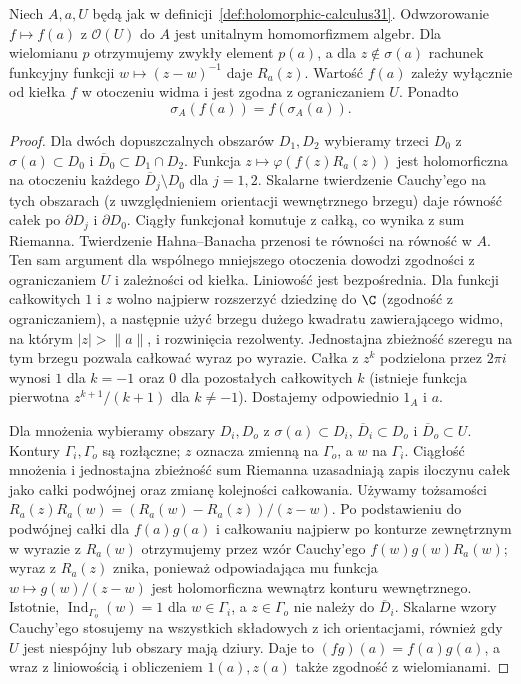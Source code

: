 \begin{twierdzenie}
\label{thm:holomorphic-calculus31}
Niech $A,a,U$ będą jak w definicji~\ref{def:holomorphic-calculus31}.
Odwzorowanie $f\mapsto f(a)$ z $\mathcal O(U)$ do $A$ jest unitalnym
homomorfizmem algebr. Dla wielomianu $p$ otrzymujemy zwykły element
$p(a)$, a dla $z\notin\sigma(a)$ rachunek funkcyjny funkcji
$w\mapsto(z-w)^{-1}$ daje $R_a(z)$. Wartość $f(a)$ zależy wyłącznie
od kiełka $f$ w otoczeniu widma i jest zgodna z ograniczaniem $U$.
Ponadto
\[
 \sigma_A(f(a))=f(\sigma_A(a)).
\]
\end{twierdzenie}
\begin{proof}
Dla dwóch dopuszczalnych obszarów $D_1,D_2$ wybieramy
trzeci $D_0$ z $\sigma(a)\subset D_0$ i
$\overline D_0\subset D_1\cap D_2$. Funkcja
$z\mapsto\varphi(f(z)R_a(z))$ jest holomorficzna
na otoczeniu każdego $\overline D_j\setminus D_0$
dla $j=1,2$. Skalarne twierdzenie Cauchy'ego na tych
obszarach (z uwzględnieniem orientacji wewnętrznego
brzegu) daje równość całek po $\partial D_j$ i
$\partial D_0$. Ciągły funkcjonał komutuje z całką,
co wynika z sum Riemanna. Twierdzenie Hahna--Banacha
przenosi te równości na równość w $A$.
Ten sam argument dla wspólnego mniejszego otoczenia
dowodzi zgodności z ograniczaniem $U$ i zależności od kiełka.
Liniowość jest bezpośrednia. Dla funkcji całkowitych
$1$ i $z$ wolno najpierw rozszerzyć dziedzinę do $\C$
(zgodność z ograniczaniem), a następnie użyć brzegu dużego kwadratu zawierającego widmo,
na którym $|z|>\|a\|$, i rozwinięcia rezolwenty. Jednostajna zbieżność szeregu na tym brzegu pozwala
całkować wyraz po wyrazie. Całka z $z^k$ podzielona
przez $2\pi i$ wynosi $1$ dla $k=-1$ oraz $0$
dla pozostałych całkowitych $k$ (istnieje funkcja
pierwotna $z^{k+1}/(k+1)$ dla $k\ne-1$).
Dostajemy odpowiednio $1_A$ i $a$.

Dla mnożenia wybieramy obszary $D_i,D_o$ z
$\sigma(a)\subset D_i$, $\overline D_i\subset D_o$
i $\overline D_o\subset U$. Kontury $\Gamma_i,\Gamma_o$
są rozłączne; $z$ oznacza zmienną na $\Gamma_o$,
a $w$ na $\Gamma_i$. Ciągłość mnożenia i jednostajna
zbieżność sum Riemanna uzasadniają zapis iloczynu całek
jako całki podwójnej oraz zmianę kolejności całkowania.
Używamy tożsamości
$R_a(z)R_a(w)=(R_a(w)-R_a(z))/(z-w)$.
Po podstawieniu do podwójnej całki dla $f(a)g(a)$
i całkowaniu najpierw po konturze zewnętrznym w wyrazie z $R_a(w)$
otrzymujemy przez wzór Cauchy'ego $f(w)g(w)R_a(w)$;
wyraz z $R_a(z)$ znika, ponieważ odpowiadająca mu funkcja
$w\mapsto g(w)/(z-w)$ jest holomorficzna wewnątrz konturu
wewnętrznego. Istotnie, $\operatorname{Ind}_{\Gamma_o}(w)=1$
dla $w\in\Gamma_i$, a $z\in\Gamma_o$ nie należy do
$\overline D_i$. Skalarne wzory Cauchy'ego stosujemy
na wszystkich składowych z ich orientacjami, również
gdy $U$ jest niespójny lub obszary mają dziury.
Daje to $(fg)(a)=f(a)g(a)$, a wraz z liniowością
i obliczeniem $1(a),z(a)$ także zgodność z wielomianami.


\end{proof}
